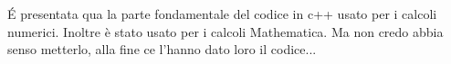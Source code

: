 \'E presentata qua la parte fondamentale del codice in c++ usato per i calcoli numerici. Inoltre è stato usato per i calcoli Mathematica.
Ma non credo abbia senso metterlo, alla fine ce l'hanno dato loro il codice...

%